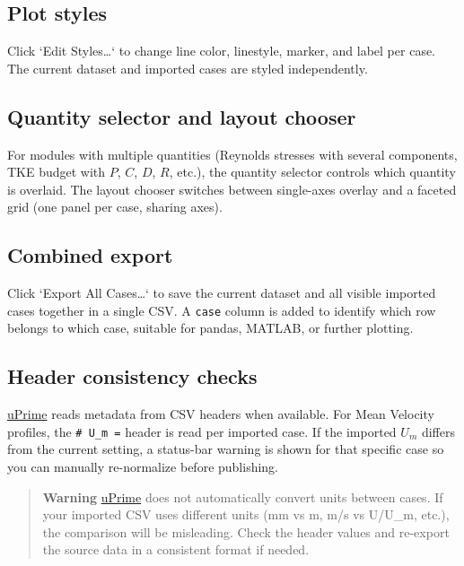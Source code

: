 \subsection{Plot styles}

Click `Edit Styles\ldots` to change line color, linestyle, marker, and label per case. The current dataset and imported cases are styled independently.

\subsection{Quantity selector and layout chooser}

For modules with multiple quantities (Reynolds stresses with several components, TKE budget with $P$, $C$, $D$, $R$, etc.), the quantity selector controls which quantity is overlaid. The layout chooser switches between single-axes overlay and a faceted grid (one panel per case, sharing axes).

\subsection{Combined export}

Click `Export All Cases\ldots` to save the current dataset and all visible imported cases together in a single CSV. A \texttt{case} column is added to identify which row belongs to which case, suitable for pandas, MATLAB, or further plotting.

\subsection{Header consistency checks}

\href{https://cmdrryder.github.io/uPrime/}{uPrime} reads metadata from CSV headers when available. For Mean Velocity profiles, the \texttt{\# U\_m =} header is read per imported case. If the imported $U_m$ differs from the current setting, a status-bar warning is shown for that specific case so you can manually re-normalize before publishing.

\begin{quote}
\textbf{Warning}
\href{https://cmdrryder.github.io/uPrime/}{uPrime} does not automatically convert units between cases. If your imported CSV uses different units (mm vs m, m/s vs U/U\_m, etc.), the comparison will be misleading. Check the header values and re-export the source data in a consistent format if needed.
\end{quote}

